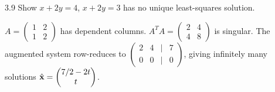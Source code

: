 \begin{exercise}{3.9}
Show $x+2y=4$, $x+2y=3$ has no unique least-squares solution.
\end{exercise}
\begin{solution}
$A=\begin{pmatrix}1&2\\1&2\end{pmatrix}$ has dependent columns. $A^TA=\begin{pmatrix}2&4\\4&8\end{pmatrix}$ is singular. The augmented system row-reduces to $\begin{pmatrix}2&4&|&7\\0&0&|&0\end{pmatrix}$, giving infinitely many solutions $\hat{\mathbf{x}}=\begin{pmatrix}7/2-2t\\t\end{pmatrix}$.
\end{solution}

